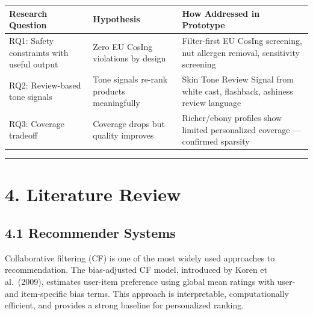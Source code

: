 \documentclass[
  letterpaper,
  DIV=11,
  numbers=noendperiod]{scrartcl}
\newcounter{none} %
\begin{document}
{\def\LTcaptype{none} %
\begin{longtable}[]{@{}
  >{\raggedright\arraybackslash}p{}
  >{\raggedright\arraybackslash}p{}
  >{\raggedright\arraybackslash}p{}@{}}
\toprule\noalign{}
\begin{minipage}[b]{\linewidth}\raggedright
Research Question
\end{minipage} & \begin{minipage}[b]{\linewidth}\raggedright
Hypothesis
\end{minipage} & \begin{minipage}[b]{\linewidth}\raggedright
How Addressed in Prototype
\end{minipage} \\
\midrule\noalign{}
\endhead
\bottomrule\noalign{}
\endlastfoot
RQ1: Safety constraints with useful output & Zero EU CosIng violations
by design & Filter-first EU CosIng screening, nut allergen removal,
sensitivity screening \\
RQ2: Review-based tone signals & Tone signals re-rank products
meaningfully & Skin Tone Review Signal from white cast, flashback,
ashiness review language \\
RQ3: Coverage tradeoff & Coverage drops but quality improves &
Richer/ebony profiles show limited personalized coverage --- confirmed
sparsity \\
\end{longtable}
}

\begin{center}\rule{0.5\linewidth}{0.5pt}\end{center}

\section{4. Literature Review}\label{literature-review}

\subsection{4.1 Recommender Systems}\label{recommender-systems}

Collaborative filtering (CF) is one of the most widely used approaches
to recommendation. The bias-adjusted CF model, introduced by Koren et
al.~(2009), estimates user-item preference using global mean ratings
with user- and item-specific bias terms. This approach is interpretable,
computationally efficient, and provides a strong baseline for
personalized ranking.
\end{document}
